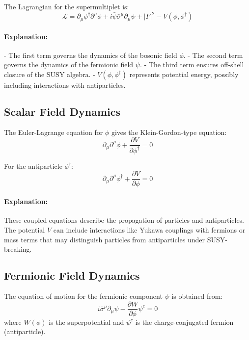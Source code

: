 \documentclass[12pt,a4paper]{article}
\begin{document}
The Lagrangian for the supermultiplet is:
\begin{equation}
\mathcal{L} = \partial_\mu \phi^\dagger \partial^\mu \phi + i \bar\psi \bar\sigma^\mu \partial_\mu \psi + |F|^2 - V(\phi, \phi^\dagger)
\end{equation}

\paragraph{Explanation:}  
- The first term governs the dynamics of the bosonic field \(\phi\).  
- The second term governs the dynamics of the fermionic field \(\psi\).  
- The third term ensures off-shell closure of the SUSY algebra.  
- \(V(\phi, \phi^\dagger)\) represents potential energy, possibly including interactions with antiparticles.

\subsection{Scalar Field Dynamics}

The Euler-Lagrange equation for \(\phi\) gives the Klein-Gordon-type equation:
\begin{equation}
\partial_\mu \partial^\mu \phi + \frac{\partial V}{\partial \phi^\dagger} = 0
\end{equation}

For the antiparticle \(\phi^\dagger\):
\begin{equation}
\partial_\mu \partial^\mu \phi^\dagger + \frac{\partial V}{\partial \phi} = 0
\end{equation}

\paragraph{Explanation:} These coupled equations describe the propagation of particles and antiparticles. The potential \(V\) can include interactions like Yukawa couplings with fermions or mass terms that may distinguish particles from antiparticles under SUSY-breaking.

\subsection{Fermionic Field Dynamics}

The equation of motion for the fermionic component \(\psi\) is obtained from:
\begin{equation}
i \bar\sigma^\mu \partial_\mu \psi - \frac{\partial W}{\partial \phi} \psi^c = 0
\end{equation}
where \(W(\phi)\) is the superpotential and \(\psi^c\) is the charge-conjugated fermion (antiparticle).
\end{document}
